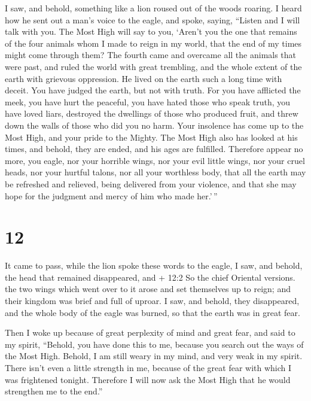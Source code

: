  I saw, and behold, something like a lion roused out of the
woods roaring. I heard how he sent out a man's voice to the eagle, and
spoke, saying,  ``Listen and I will talk with you. The Most
High will say to you,  `Aren't you the one that remains of
the four animals whom I made to reign in my world, that the end of my
times might come through them?  The fourth came and
overcame all the animals that were past, and ruled the world with great
trembling, and the whole extent of the earth with grievous oppression.
He lived on the earth such a long time with deceit.  You
have judged the earth, but not with truth.  For you have
afflicted the meek, you have hurt the peaceful, you have hated those who
speak truth, you have loved liars, destroyed the dwellings of those who
produced fruit, and threw down the walls of those who did you no harm.
 Your insolence has come up to the Most High, and your
pride to the Mighty.  The Most High also has looked at his
times, and behold, they are ended, and his ages are fulfilled.
 Therefore appear no more, you eagle, nor your horrible
wings, nor your evil little wings, nor your cruel heads, nor your
hurtful talons, nor all your worthless body,  that all the
earth may be refreshed and relieved, being delivered from your violence,
and that she may hope for the judgment and mercy of him who made
her.'\,''

\hypertarget{section-11}{%
\section{12}\label{section-11}}

 It came to pass, while the lion spoke these words to the
eagle, I saw,  and behold, the head that remained
disappeared, and + 12:2 So the chief Oriental versions. the two wings
which went over to it arose and set themselves up to reign; and their
kingdom was brief and full of uproar.  I saw, and behold,
they disappeared, and the whole body of the eagle was burned, so that
the earth was in great fear.

Then I woke up because of great perplexity of mind and great fear, and
said to my spirit,  ``Behold, you have done this to me,
because you search out the ways of the Most High.  Behold, I
am still weary in my mind, and very weak in my spirit. There isn't even
a little strength in me, because of the great fear with which I was
frightened tonight.  Therefore I will now ask the Most High
that he would strengthen me to the end.''

